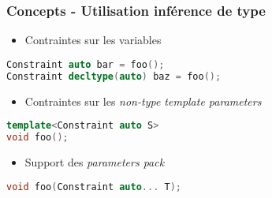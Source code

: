 \documentclass[C++.tex]{subfiles}
\begin{document}
\begin{frame}[fragile]
	\frametitle{Concepts - Utilisation inférence de type}
	\begin{itemize}
		\item Contraintes sur les variables
	\end{itemize}

	\begin{lstlisting}[language=C++]
Constraint auto bar = foo();
Constraint decltype(auto) baz = foo();\end{lstlisting}

	\begin{itemize}
		\item Contraintes sur les \textit{non-type template parameters}
	\end{itemize}

	\begin{lstlisting}[language=C++]
template<Constraint auto S>
void foo();\end{lstlisting}

	\begin{itemize}
		\item Support des \textit{parameters pack}
	\end{itemize}

	\begin{lstlisting}[language=C++]
void foo(Constraint auto... T);\end{lstlisting}
\end{frame}
\end{document}
